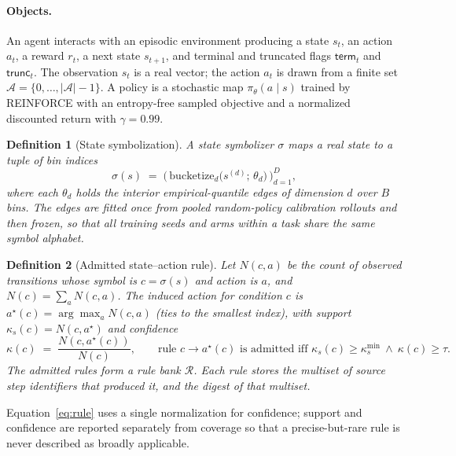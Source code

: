 \documentclass[11pt]{article}
\newtheorem{definition}{Definition}
\newcommand{\sest}{\sigma}
\newcommand{\Rules}{\mathcal{R}}
\begin{document}
\paragraph{Objects.}
An agent interacts with an episodic environment producing a state $s_t$, an action $a_t$, a
reward $r_t$, a next state $s_{t+1}$, and terminal and truncated flags $\mathsf{term}_t$ and
$\mathsf{trunc}_t$. The observation $s_t$ is a real vector;
the action $a_t$ is drawn from a finite set $\mathcal{A}=\{0,\dots,|\mathcal{A}|-1\}$. A policy
is a stochastic map $\pi_\theta(a\mid s)$ trained by REINFORCE with an entropy-free sampled
objective and a normalized discounted return with $\gamma=0.99$.

\begin{definition}[State symbolization]
\label{def:symbolizer}
A \emph{state symbolizer} $\sest$ maps a real state to a tuple of bin indices
\begin{equation}
\sest(s) \;=\; \big(\,\mathrm{bucketize}_{d}\!\big(s^{(d)};\,\theta_{d}\big)\,\big)_{d=1}^{D},
\label{eq:symbolize}
\end{equation}
where each $\theta_{d}$ holds the interior empirical-quantile edges of dimension $d$ over $B$
bins. The edges are fitted once from pooled random-policy calibration rollouts and then
\emph{frozen}, so that all training seeds and arms within a task share the same symbol alphabet.
\end{definition}

\begin{definition}[Admitted state--action rule]
\label{def:rule}
Let $N(c,a)$ be the count of observed transitions whose symbol is $c=\sest(s)$ and action is $a$,
and $N(c)=\sum_{a}N(c,a)$. The induced action for condition $c$ is
$a^{\star}(c)=\arg\max_{a}N(c,a)$ (ties to the smallest index), with support
$\kappa_{s}(c)=N(c,a^{\star})$ and confidence
\begin{equation}
\kappa(c) \;=\; \frac{N(c,a^{\star}(c))}{N(c)},
\qquad
\text{rule } c\!\rightarrow\!a^{\star}(c) \text{ is admitted iff }
\kappa_{s}(c)\ge \kappa_{s}^{\min}\ \wedge\ \kappa(c)\ge \tau .
\label{eq:rule}
\end{equation}
The admitted rules form a rule bank $\Rules$. Each rule stores the multiset of source step
identifiers that produced it, and the digest of that multiset.
\end{definition}

Equation~\eqref{eq:rule} uses a single normalization for confidence; support and confidence are
reported separately from coverage so that a precise-but-rare rule is never described as broadly
applicable.
\end{document}
